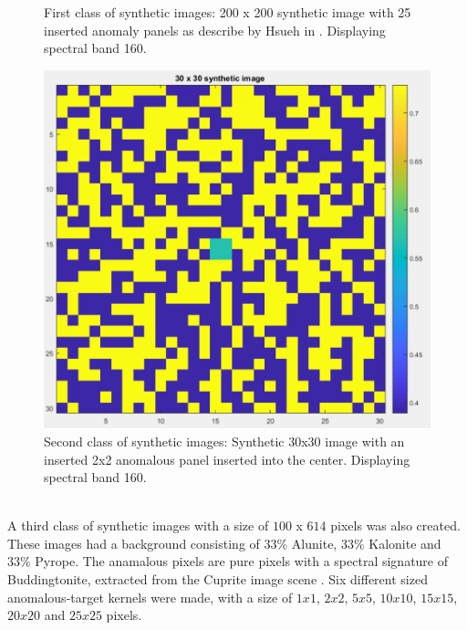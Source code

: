 \begin{figure}[H]
\begin{minipage}[]{.5\linewidth}
\end{minipage}


\caption{First class of synthetic images: 200 x 200 synthetic image with 25 inserted anomaly panels as describe by Hsueh in \cite{hsueh_master_thesis}. Displaying spectral band 160. }
\label{fig:hsueh_image}
\end{figure}

\begin{figure}[H]
\centering
   \includegraphics[scale=0.4]{images/AD_testing/synthetic_images/30_30_anomaly_image.PNG}
  \caption{Second class of synthetic images: Synthetic 30x30 image with an inserted 2x2 anomalous panel inserted into the center. Displaying spectral band 160. } 
  \label{fig:synthetic_30_30}
\end{figure}


\\
A third class of synthetic images with a size of $100$ x $614$ pixels was also created. These images had a background consisting of $33\%$ Alunite, $33\%$ Kalonite and $33\%$ Pyrope. The anamalous pixels are pure pixels with a spectral signature of Buddingtonite, extracted from the Cuprite image scene \cite{ground_truth_cuprite}. Six different sized anomalous-target kernels were made, with a size of $1x1$, $2x2$, $5x5$, $10x10$, $15x15$, $20x20$ and $25x25$ pixels.




